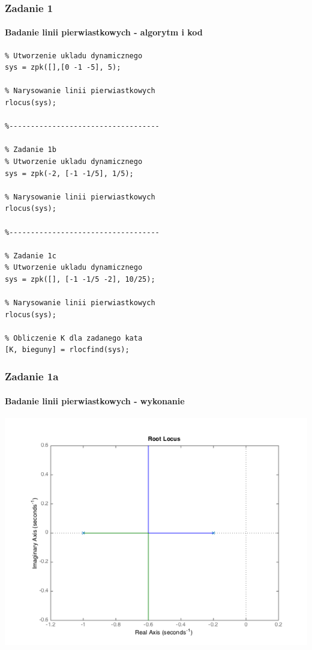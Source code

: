 \documentclass{beamer}
\begin{document}
\begin{frame}[fragile]\frametitle{Zadanie 1}\framesubtitle{Badanie linii pierwiastkowych - algorytm i kod}

\begin{lstlisting}[centering]
% Zadanie 1a
% Utworzenie ukladu dynamicznego
sys = zpk([],[0 -1 -5], 5);

% Narysowanie linii pierwiastkowych
rlocus(sys);

%-----------------------------------

% Zadanie 1b
% Utworzenie ukladu dynamicznego
sys = zpk(-2, [-1 -1/5], 1/5);

% Narysowanie linii pierwiastkowych
rlocus(sys);

%-----------------------------------

% Zadanie 1c
% Utworzenie ukladu dynamicznego
sys = zpk([], [-1 -1/5 -2], 10/25);

% Narysowanie linii pierwiastkowych
rlocus(sys);

% Obliczenie K dla zadanego kata
[K, bieguny] = rlocfind(sys);

\end{lstlisting}

\end{frame}

\begin{frame}\frametitle{Zadanie 1a}\framesubtitle{Badanie linii pierwiastkowych - wykonanie}

\centering	\includegraphics[scale=0.45]{zadanie1_a.png}

\end{frame}
\end{document}
